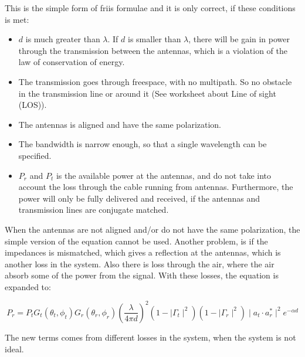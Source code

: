 This is the simple form of friis formulae and it is only correct, if these conditions is met:
\begin{itemize}
\item $d$ is much greater than $\lambda$. If $d$ is smaller than $\lambda$, there will be gain in power through the transmission between the antennas, which is a violation of the law of conservation of energy.
\item The transmission goes through freespace, with no multipath. So no obstacle in the transmission line or around it (See worksheet about Line of sight (LOS)).
\item The antennas is aligned and have the same polarization.
\item The bandwidth is narrow enough, so that a single wavelength can be specified.
\item $P_r$ and $P_t$ is the available power at the antennas, and do not take into account the loss through the cable running from antennas. Furthermore, the power will only be fully delivered and received, if the antennas and transmission lines are conjugate matched.
\end{itemize}


When the antennas are not aligned and/or do not have the same polarization, the simple version of the equation cannot be used. Another problem, is if the impedances is mismatched, which gives a reflection at the antennas, which is another loss in the system. Also there is loss through the air, where the air absorb some of the power from the signal. With these losses, the equation is expanded to:

\begin{equation}
P_r = P_t G_t(\theta_t, \phi_t) G_r(\theta_r, \phi_r) (\frac{\lambda}{4 \pi d})^2 (1 - \mid \Gamma_t \mid^2) (1 - \mid \Gamma_r \mid^2) \mid a_t \cdot a_r^* \mid^2 e^{- \alpha d}
\end{equation}
\begin{where}
\end{where}

The new terms comes from different losses in the system, when the system is not ideal.



